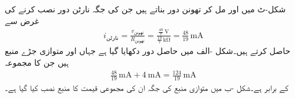 شکل-ٹ میں  اور   مل کر تھونن دور بناتے ہیں جن کی جگہ نارٹن دور نصب کرنے کی غرض سے 
\begin{align*}
i_{\text{نارٹن}}=\frac{v_{\text{تھونن}}}{R_{\text{تھونن}}}=\frac{\frac{48}{7} \, \si{\volt}}{\frac{19}{7} \, \si{\kilo\ohm}}=\frac{48}{19}\,\si{\milli\ampere}
\end{align*}
حاصل کرتے ہیں۔شکل -الف میں حاصل دور دکھایا گیا ہے جہاں  اور  متوازی جڑے منبع ہیں جن کا مجموعہ 
\begin{align*}
\frac{48}{19}\,\si{\milli\ampere}+\SI{4}{\milli\ampere}=\frac{124}{19}\,\si{\milli\ampere}
\end{align*}
کے برابر ہے۔شکل -ب میں متوازی منبع کی جگہ ان کی مجموعی قیمت کا منبع نصب کیا گیا ہے۔

